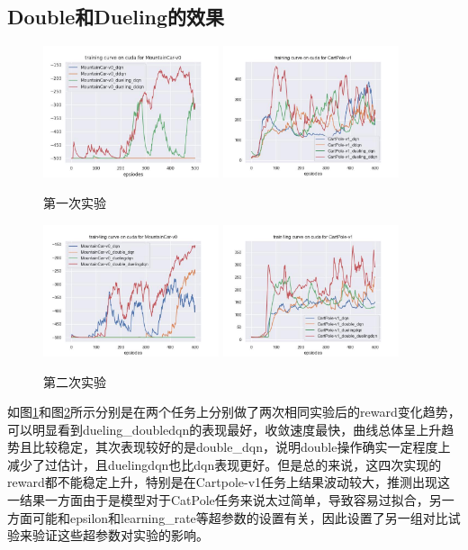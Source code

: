 \documentclass[a4paper]{ctexart}
\begin{document}
\subsection{Double和Dueling的效果}
\begin{figure}[H]
    \centering
    \includegraphics[width=0.46\textwidth]{train.jpg}
    \includegraphics[width=0.46\textwidth]{train2.jpg}
    \caption{第一次实验}
    \label{a}
\end{figure}
\begin{figure}[H]
    \centering
    \includegraphics[width=0.46\textwidth]{train8.jpg}
    \includegraphics[width=0.46\textwidth]{train5.jpg}
    \caption{第二次实验}
    \label{b}
\end{figure}
如图\ref{a}和图\ref{b}所示分别是在两个任务上分别做了两次相同实验后的reward变化趋势，可以明显看到dueling\_doubledqn的表现最好，收敛速度最快，曲线总体呈上升趋势且比较稳定，其次表现较好的是double\_dqn，说明double操作确实一定程度上减少了过估计，且duelingdqn也比dqn表现更好。但是总的来说，这四次实现的reward都不能稳定上升，特别是在Cartpole-v1任务上结果波动较大，推测出现这一结果一方面由于是模型对于CatPole任务来说太过简单，导致容易过拟合，另一方面可能和epsilon和learning\_rate等超参数的设置有关，因此设置了另一组对比试验来验证这些超参数对实验的影响。
\end{document}
